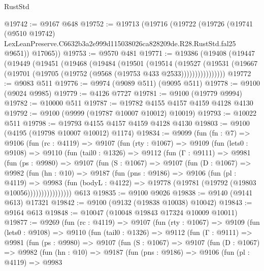 \begin{lexlean}{RustStd}
\begin{coremodule}
@19742 := @9167 @648
@19752 := @19713
    (@19716
      (@19722
        (@19726
          (@19741
            (@9510 @19742)
            LexLeanPreserve.C6632b3a2e999d115038026ca828209de.R28.RustStd.fal25
            @9651))
        @17065))
@19753 := @9570 @481
@19771 := @19386
    (@19408
      (@19447
        (@19449
          (@19451
            (@19468
              (@19484
                (@19501
                  (@19514
                    (@19527
                      (@19531
                        (@19667 (@19701 (@19705 (@19752 (@9568 (@19753 @433 @2533))))))))))))))))
@19772 := @9083 @511
@19776 := @9974 (@9089 @511) (@9095 @511)
@19778 := @9100 (@9024 @9985)
@19779 := @4126 @7727
@19781 := @9100 (@19779 @9994)
@19782 := @10000 @511
@19787 := @19782 @4155 @4157 @4159 @4128 @4130
@19792 := @9100 (@9999 (@19787 @10007 @10012) @10019)
@19793 := @10022 @511
@19798 := @19793 @4155 @4157 @4159 @4128 @4130
@19803 := @9100 (@4195 (@19798 @10007 @10012) @1174)
@19834 := @9099
    (fun (fn : @7) =>
    @9106
      (fun (rc : @4119) =>
      @9107
        (fun (rty : @1067) =>
        @9109
          (fun (lets0 : @9108) =>
          @9110
            (fun (tail0 : @1326) =>
            @9112
              (fun (Γ : @9111) =>
              @9981
                (fun (ps : @9980) =>
                @9107
                  (fun (S : @1067) =>
                  @9107
                    (fun (D : @1067) =>
                    @9982
                      (fun (hn : @10) =>
                      @9187
                        (fun (pns : @9186) =>
                        @9106
                          (fun (pl : @4119) =>
                          @9983
                            (fun (bodyL : @4122) =>
                            @19778 (@19781 (@19792 (@19803 @10056))))))))))))))))
    @613
@19835 := @9100 @9026
@19838 := @9140 (@9141 @613) @17321
@19842 := @9100 (@9132 (@19838 @10038) @10042)
@19843 := @9164 @613
@19848 := @10047 (@10048 @19843 @17324 @10009 @10011)
@19877 := @9269
    (fun (rc : @4119) =>
    @9107
      (fun (rty : @1067) =>
      @9109
        (fun (lets0 : @9108) =>
        @9110
          (fun (tail0 : @1326) =>
          @9112
            (fun (Γ : @9111) =>
            @9981
              (fun (ps : @9980) =>
              @9107
                (fun (S : @1067) =>
                @9107
                  (fun (D : @1067) =>
                  @9982
                    (fun (hn : @10) =>
                    @9187
                      (fun (pns : @9186) =>
                      @9106
                        (fun (pl : @4119) =>
                        @9983

\end{coremodule}
\end{lexlean}
